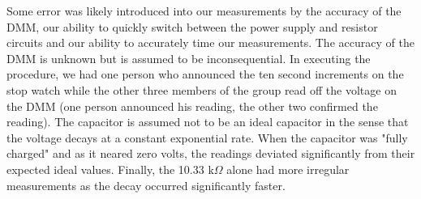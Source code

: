 \documentclass{article}
\begin{document}
\begin{samepage}
Some error was likely introduced into our measurements by the accuracy of the DMM, our ability to quickly switch between the power supply and resistor circuits and our ability to accurately time our measurements.  The accuracy of the DMM is unknown but is assumed to be inconsequential.  In executing the procedure, we had one person who announced the ten second increments on the stop watch while the other three members of the group read off the voltage on the DMM (one person announced his reading, the other two confirmed the reading).  The capacitor is assumed not to be an ideal capacitor in the sense that the voltage decays at a constant exponential rate.  When the capacitor was "fully charged" and as it neared zero volts, the readings deviated significantly from their expected ideal values.  Finally, the 10.33 k$\Omega$ alone had more irregular measurements as the decay occurred significantly faster.
\end{samepage}
\end{document}
